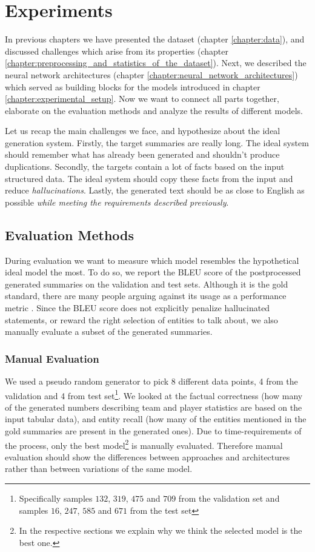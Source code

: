 \chapter{Experiments} \label{chapter:experiments}

In previous chapters we have presented the dataset (chapter \ref{chapter:data}), and discussed challenges which arise from its properties (chapter \ref{chapter:preprocessing_and_statistics_of_the_dataset}). Next, we described the neural network architectures (chapter \ref{chapter:neural_network_architectures}) which served as building blocks for the models introduced in chapter \ref{chapter:experimental_setup}. Now we want to connect all parts together, elaborate on the evaluation methods and analyze the results of different models.

Let us recap the main challenges we face, and hypothesize about the ideal generation system. Firstly, the target summaries are really long. The ideal system should remember what has already been generated and shouldn't produce duplications. Secondly, the targets contain a lot of facts based on the input structured data. The ideal system should copy these facts from the input and reduce \emph{hallucinations}. Lastly, the generated text should be as close to English as possible \emph{while meeting the requirements described previously}.

\section{Evaluation Methods}

During evaluation we want to measure which model resembles the hypothetical ideal model the most. To do so, we report the BLEU score \citep{papineni2002} of the postprocessed generated summaries on the validation and test sets. Although it is the gold standard, there are many people arguing against its usage as a performance metric \citep{celikyilmaz2021evaluation}. Since the BLEU score does not explicitly penalize hallucinated statements, or reward the right selection of entities to talk about, we also manually evaluate a subset of the generated summaries.

\subsection{Manual Evaluation}

We used a pseudo random generator to pick 8 different data points, 4 from the validation and 4 from test set\footnote{Specifically samples $132$, $319$, $475$ and $709$ from the validation set and samples $16$, $247$, $585$ and $671$ from the test set}. We looked at the factual correctness (how many of the generated numbers describing team and player statistics are based on the input tabular data), and entity recall (how many of the entities mentioned in the gold summaries are present in the generated ones). Due to time-requirements of the process, only the best model\footnote{In the respective sections we explain why we think the selected model is the best one.} is manually evaluated. Therefore manual evaluation should show the differences between approaches and architectures rather than between variations of the same model.

